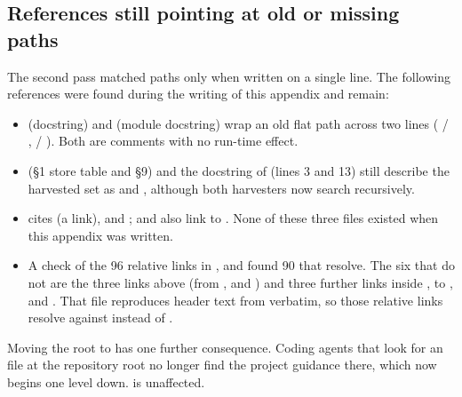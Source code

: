 \subsection{References still pointing at old or missing paths}
The second pass matched paths only when written on a single line. The following references were found during the writing of this appendix and remain:
\begin{itemize}
  \item {} (docstring) and  (module docstring) wrap an old flat path across two lines ( / ,  / ). Both are comments with no run-time effect.
  \item {} (§1 store table and §9) and the docstring of  (lines 3 and 13) still describe the harvested set as  and , although both harvesters now search recursively.
  \item {} cites  (a link),  and ;  and  also link to . None of these three files existed when this appendix was written.
  \item A check of the 96 relative links in ,  and  found 90 that resolve. The six that do not are the three  links above (from ,  and ) and three further links inside , to ,  and . That file reproduces header text from  verbatim, so those relative links resolve against  instead of .
\end{itemize}
Moving the root  to  has one further consequence. Coding agents that look for an  file at the repository root no longer find the project guidance there, which now begins one level down.  is unaffected.

